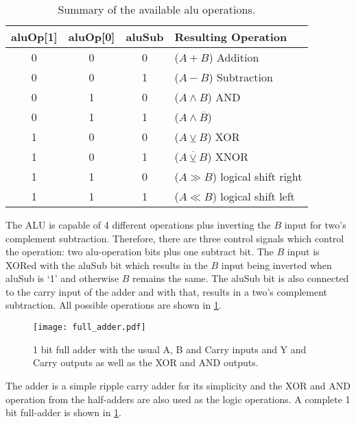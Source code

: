 \subsubsection{}
\begin{table}
  \centering
  \renewcommand{\arraystretch}{1.25}
  \caption{Summary of the available alu operations.}
  \label{tab:aluOp}
  \begin{tabularx}{.8\textwidth}{ |c|c|c||X| }
    \hline
    aluOp[1] & aluOp[0] & aluSub & Resulting Operation\\\hline\hline
    0 & 0 & 0 & ($A + B$) Addition \\\hline
    0 & 0 & 1 & ($A - B$) Subtraction \\\hline
    0 & 1 & 0 & ($A \land B$) AND \\\hline
    0 & 1 & 1 & ($A \land \overline{B}$) \\\hline
    1 & 0 & 0 & ($A \veebar B$) XOR \\\hline
    1 & 0 & 1 & ($\overline{A \veebar B}$) XNOR \\\hline
    1 & 1 & 0 & ($A \gg B$) logical shift right \\\hline
    1 & 1 & 1 & ($A \ll B$) logical shift left \\\hline
  \end{tabularx}
\end{table}
The \gls{ALU} is capable of 4 different operations plus inverting the $B$ input for two's complement subtraction.
Therefore, there are three control signals which control the operation: two alu-operation bits plus one subtract bit.
The $B$ input is XORed with the aluSub bit which results in the $B$ input being inverted when aluSub is `1' and otherwise $B$ remains the same.
The aluSub bit is also connected to the carry input of the adder and with that, results in a two's complement subtraction.
All possible operations are shown in \cref{tab:aluOp}.
\begin{figure}[t]
  \centering
  \texttt{[image: full\_adder.pdf]}
  \caption{1 bit full adder with the usual A, B and Carry inputs and Y and Carry outputs as well as the XOR and AND outputs.}
  \label{fig:full_adder}
\end{figure}
The adder is a simple ripple carry adder for its simplicity and the XOR and AND operation from the half-adders are also used as the logic operations.
A complete 1 bit full-adder is shown in \cref{fig:full_adder}.


